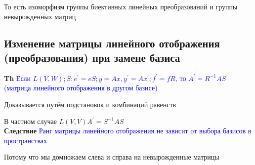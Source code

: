 \documentclass[a4paper, 14pt]{article}
\begin{document}
    То есть изоморфизм группы биективных линейных преобразований и группы невырожденных матриц

    \subsection{Изменение матрицы линейного отображения (преобразования) при замене базиса}

    \textbf{Th} \textcolor{blue}{Если $L(V, W); S: e^{'} = eS; y = Ax, y^{'} = Ax^{'}; f^{'} = fR$, то
        $A^{'} = R^{-1}AS$ (матрица линейного отображения в другом базисе)}

    Доказывается путём подстановок и комбинаций равенств

    В частном случае $L(V, V) A^{'} = S^{-1}AS$ \\

    \textbf{Следствие} \textcolor{blue}{Ранг матрицы линейного отображения не зависит от выбора базисов в
    пространствах}

    Потому что мы домножаем слева и справа на невырожденные матрицы
\end{document}
